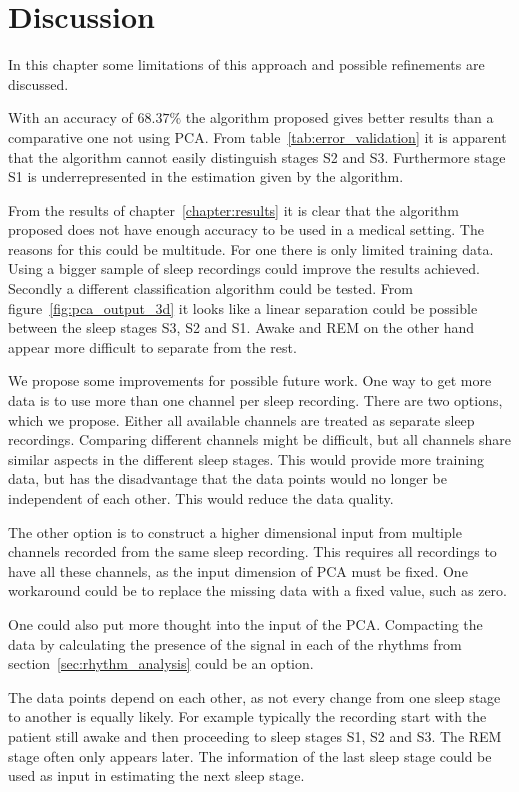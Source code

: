 \chapter{Discussion}
\label{chapter:discussion}

In this chapter some limitations of this approach and possible refinements are discussed.

With an accuracy of $68.37\%$ the algorithm proposed gives better results than a comparative one not using PCA. From table~\ref{tab:error_validation} it is apparent that the algorithm cannot easily distinguish stages S2 and S3. Furthermore stage S1 is underrepresented in the estimation given by the algorithm.

From the results of chapter~\ref{chapter:results} it is clear that the algorithm proposed does not have enough accuracy to be used in a medical setting. The reasons for this could be multitude. For one there is only limited training data. Using a bigger sample of sleep recordings could improve the results achieved. Secondly a different classification algorithm could be tested. From figure~\ref{fig:pca_output_3d} it looks like a linear separation could be possible between the sleep stages S3, S2 and S1. Awake and REM on the other hand appear more difficult to separate from the rest.

We propose some improvements for possible future work. One way to get more data is to use more than one channel per sleep recording. There are two options, which we propose. Either all available channels are treated as separate sleep recordings. Comparing different channels might be difficult, but all channels share similar aspects in the different sleep stages. This would provide more training data, but has the disadvantage that the data points would no longer be independent of each other. This would reduce the data quality.

The other option is to construct a higher dimensional input from multiple channels recorded from the same sleep recording. This requires all recordings to have all these channels, as the input dimension of PCA must be fixed. One workaround could be to replace the missing data with a fixed value, such as zero.

One could also put more thought into the input of the PCA. Compacting the data by calculating the presence of the signal in each of the rhythms from section~\ref{sec:rhythm_analysis} could be an option.

The data points depend on each other, as not every change from one sleep stage to another is equally likely. For example typically the recording start with the patient still awake and then proceeding to sleep stages S1, S2 and S3. The REM stage often only appears later. The information of the last sleep stage could be used as input in estimating the next sleep stage.

